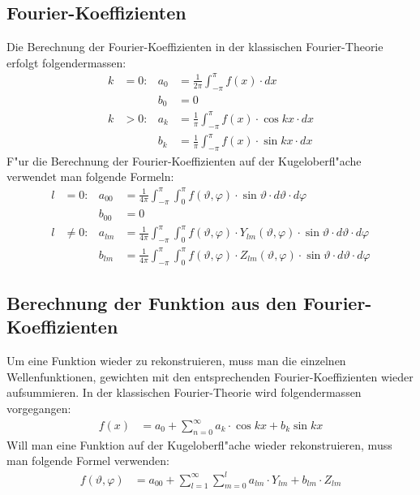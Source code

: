 \begin{refsection}
\subsection{Fourier-Koeffizienten}
Die Berechnung der Fourier-Koeffizienten in der klassischen 
Fourier-Theorie erfolgt folgendermassen:
\begin{align*}
k&= 0: & a_{0} &= \frac{1}{2\pi} \int_{-\pi}^\pi f(x) \cdot dx
\\
&  & b_{0} &= 0
\\
k& > 0: & a_{k} &= \frac{1}{\pi} \int_{-\pi}^\pi f(x) \cdot \cos kx \cdot dx
\\
& & b_{k} &= \frac{1}{\pi} \int_{-\pi}^\pi f(x) \cdot \sin kx \cdot dx
\end{align*}
F"ur die Berechnung der Fourier-Koeffizienten auf der Kugeloberfl"ache 
verwendet man folgende Formeln:
\begin{align*}
l&=0: & a_{00} &= \frac{1}{4\pi} \int_{-\pi}^\pi \int_{0}^\pi f(\vartheta,\varphi) \cdot \sin\vartheta \cdot d\vartheta \cdot d\varphi
\\
&  & b_{00} &= 0
\\
l&\ne 0: & a_{lm} &= \frac{1}{4\pi} \int_{-\pi}^\pi \int_{0}^\pi f(\vartheta,\varphi) \cdot Y_{lm} (\vartheta, \varphi) \cdot \sin\vartheta \cdot d\vartheta \cdot d\varphi
\\
&  & b_{lm} &= \frac{1}{4\pi} \int_{-\pi}^\pi \int_{0}^\pi f(\vartheta,\varphi) \cdot Z_{lm} (\vartheta, \varphi) \cdot \sin\vartheta \cdot d\vartheta \cdot d\varphi
\end{align*}

\subsection{Berechnung der Funktion aus den Fourier-Koeffizienten}
Um eine Funktion wieder zu rekonstruieren, muss man die einzelnen 
Wellenfunktionen, gewichten mit den entsprechenden Fourier-Koeffizienten 
wieder aufsummieren.
In der klassischen Fourier-Theorie wird folgendermassen vorgegangen:
\begin{align*}
f(x)&=a_0 + \sum_{n=0}^\infty a_k \cdot \cos kx + b_k \sin kx
\end{align*}
Will man eine Funktion auf der Kugeloberfl"ache wieder rekonstruieren, 
muss man folgende Formel verwenden:
\begin{align*}
f(\vartheta, \varphi) &= a_{00} + \sum_{l=1}^\infty \sum_{m=0}^l a_{lm} \cdot Y_{lm} + b_{lm} \cdot Z_{lm}
\end{align*}


\end{refsection}
